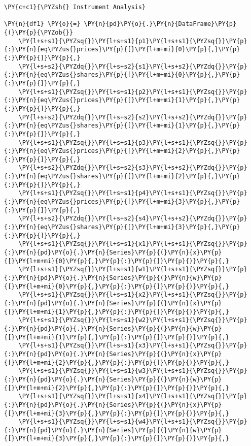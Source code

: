     \begin{tcolorbox}[breakable, size=fbox, boxrule=1pt, pad at break*=1mm,colback=cellbackground, colframe=cellborder]
\begin{Verbatim}[commandchars=\\\{\}]
\PY{c+c1}{\PYZsh{} Instrument Analysis}

\PY{n}{df1} \PY{o}{=} \PY{n}{pd}\PY{o}{.}\PY{n}{DataFrame}\PY{p}{(}\PY{p}{\PYZob{}}
    \PY{l+s+s1}{\PYZsq{}}\PY{l+s+s1}{p1}\PY{l+s+s1}{\PYZsq{}}\PY{p}{:}\PY{n}{eq\PYZus{}prices}\PY{p}{[}\PY{l+m+mi}{0}\PY{p}{,}\PY{p}{:}\PY{p}{]}\PY{p}{,}
    \PY{l+s+s2}{\PYZdq{}}\PY{l+s+s2}{s1}\PY{l+s+s2}{\PYZdq{}}\PY{p}{:}\PY{n}{eq\PYZus{}shares}\PY{p}{[}\PY{l+m+mi}{0}\PY{p}{,}\PY{p}{:}\PY{p}{]}\PY{p}{,}
    \PY{l+s+s1}{\PYZsq{}}\PY{l+s+s1}{p2}\PY{l+s+s1}{\PYZsq{}}\PY{p}{:}\PY{n}{eq\PYZus{}prices}\PY{p}{[}\PY{l+m+mi}{1}\PY{p}{,}\PY{p}{:}\PY{p}{]}\PY{p}{,}
    \PY{l+s+s2}{\PYZdq{}}\PY{l+s+s2}{s2}\PY{l+s+s2}{\PYZdq{}}\PY{p}{:}\PY{n}{eq\PYZus{}shares}\PY{p}{[}\PY{l+m+mi}{1}\PY{p}{,}\PY{p}{:}\PY{p}{]}\PY{p}{,}
    \PY{l+s+s1}{\PYZsq{}}\PY{l+s+s1}{p3}\PY{l+s+s1}{\PYZsq{}}\PY{p}{:}\PY{n}{eq\PYZus{}prices}\PY{p}{[}\PY{l+m+mi}{2}\PY{p}{,}\PY{p}{:}\PY{p}{]}\PY{p}{,}
    \PY{l+s+s2}{\PYZdq{}}\PY{l+s+s2}{s3}\PY{l+s+s2}{\PYZdq{}}\PY{p}{:}\PY{n}{eq\PYZus{}shares}\PY{p}{[}\PY{l+m+mi}{2}\PY{p}{,}\PY{p}{:}\PY{p}{]}\PY{p}{,}
    \PY{l+s+s1}{\PYZsq{}}\PY{l+s+s1}{p4}\PY{l+s+s1}{\PYZsq{}}\PY{p}{:}\PY{n}{eq\PYZus{}prices}\PY{p}{[}\PY{l+m+mi}{3}\PY{p}{,}\PY{p}{:}\PY{p}{]}\PY{p}{,}
    \PY{l+s+s2}{\PYZdq{}}\PY{l+s+s2}{s4}\PY{l+s+s2}{\PYZdq{}}\PY{p}{:}\PY{n}{eq\PYZus{}shares}\PY{p}{[}\PY{l+m+mi}{3}\PY{p}{,}\PY{p}{:}\PY{p}{]}\PY{p}{,}
    \PY{l+s+s1}{\PYZsq{}}\PY{l+s+s1}{x1}\PY{l+s+s1}{\PYZsq{}}\PY{p}{:}\PY{n}{pd}\PY{o}{.}\PY{n}{Series}\PY{p}{(}\PY{n}{x}\PY{p}{[}\PY{l+m+mi}{0}\PY{p}{,}\PY{p}{:}\PY{p}{]}\PY{p}{)}\PY{p}{,}
    \PY{l+s+s1}{\PYZsq{}}\PY{l+s+s1}{w1}\PY{l+s+s1}{\PYZsq{}}\PY{p}{:}\PY{n}{pd}\PY{o}{.}\PY{n}{Series}\PY{p}{(}\PY{n}{w}\PY{p}{[}\PY{l+m+mi}{0}\PY{p}{,}\PY{p}{:}\PY{p}{]}\PY{p}{)}\PY{p}{,}
    \PY{l+s+s1}{\PYZsq{}}\PY{l+s+s1}{x2}\PY{l+s+s1}{\PYZsq{}}\PY{p}{:}\PY{n}{pd}\PY{o}{.}\PY{n}{Series}\PY{p}{(}\PY{n}{x}\PY{p}{[}\PY{l+m+mi}{1}\PY{p}{,}\PY{p}{:}\PY{p}{]}\PY{p}{)}\PY{p}{,}
    \PY{l+s+s1}{\PYZsq{}}\PY{l+s+s1}{w2}\PY{l+s+s1}{\PYZsq{}}\PY{p}{:}\PY{n}{pd}\PY{o}{.}\PY{n}{Series}\PY{p}{(}\PY{n}{w}\PY{p}{[}\PY{l+m+mi}{1}\PY{p}{,}\PY{p}{:}\PY{p}{]}\PY{p}{)}\PY{p}{,}
    \PY{l+s+s1}{\PYZsq{}}\PY{l+s+s1}{x3}\PY{l+s+s1}{\PYZsq{}}\PY{p}{:}\PY{n}{pd}\PY{o}{.}\PY{n}{Series}\PY{p}{(}\PY{n}{x}\PY{p}{[}\PY{l+m+mi}{2}\PY{p}{,}\PY{p}{:}\PY{p}{]}\PY{p}{)}\PY{p}{,}
    \PY{l+s+s1}{\PYZsq{}}\PY{l+s+s1}{w3}\PY{l+s+s1}{\PYZsq{}}\PY{p}{:}\PY{n}{pd}\PY{o}{.}\PY{n}{Series}\PY{p}{(}\PY{n}{w}\PY{p}{[}\PY{l+m+mi}{2}\PY{p}{,}\PY{p}{:}\PY{p}{]}\PY{p}{)}\PY{p}{,}
    \PY{l+s+s1}{\PYZsq{}}\PY{l+s+s1}{x4}\PY{l+s+s1}{\PYZsq{}}\PY{p}{:}\PY{n}{pd}\PY{o}{.}\PY{n}{Series}\PY{p}{(}\PY{n}{x}\PY{p}{[}\PY{l+m+mi}{3}\PY{p}{,}\PY{p}{:}\PY{p}{]}\PY{p}{)}\PY{p}{,}
    \PY{l+s+s1}{\PYZsq{}}\PY{l+s+s1}{w4}\PY{l+s+s1}{\PYZsq{}}\PY{p}{:}\PY{n}{pd}\PY{o}{.}\PY{n}{Series}\PY{p}{(}\PY{n}{w}\PY{p}{[}\PY{l+m+mi}{3}\PY{p}{,}\PY{p}{:}\PY{p}{]}\PY{p}{)}\PY{p}{,}


\end{Verbatim}
\end{tcolorbox}
